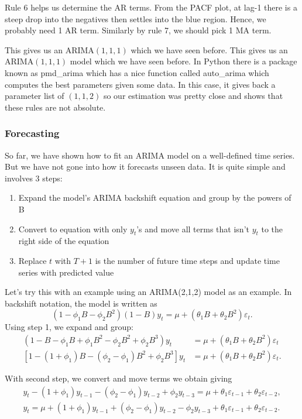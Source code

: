 \documentclass{article}
\begin{document}
  Rule 6 helps us determine the AR terms. From the PACF plot, at lag-1 there is a steep drop into the negatives then settles into the blue region. Hence, we probably need 1 AR term. Similarly by rule 7, we should pick 1 MA term.

  This gives us an ARIMA$(1,1,1)$ which we have seen before. This gives us an ARIMA$(1,1,1)$ model which we have seen before. In Python there is a package known as pmd\_arima which has a nice function called auto\_arima which computes the best parameters given some data. In this case, it gives back a parameter list of $(1,1,2)$ so our estimation was pretty close and shows that these rules are not absolute.
  

  \subsubsection{Forecasting}
  So far, we have shown how to fit an ARIMA model on a well-defined time series. But we have not gone into how it forecasts unseen data. It is quite simple and involves 3 steps:
  \begin{enumerate}
    \item Expand the model's ARIMA backshift equation and group by the powers of B
    \item Convert to equation with only $y_t$'s and move all terms that isn't $y_t$ to the right side of the equation
    \item Replace $t$ with $T+1$ is the number of future time steps and update time series with predicted value
  \end{enumerate}
  Let's try this with an example using an ARIMA(2,1,2) model as an example. In backshift notation, the model is written as
  \begin{equation*}
    (1 - \phi_1B - \phi_2B^2)(1-B)y_t = \mu + (\theta_1B + \theta_2B^2)\varepsilon_t.
  \end{equation*}
  Using step 1, we expand and group:
  \begin{align*}
    (1 - B - \phi_1B + \phi_1B^2 - \phi_2B^2 + \phi_2B^3)y_t &= \mu + (\theta_1B + \theta_2B^2)\varepsilon_t\\
    [1 - (1 + \phi_1)B - (\phi_2 - \phi_1)B^2 + \phi_2B^3]y_t &= \mu + (\theta_1B + \theta_2B^2)\varepsilon_t.
  \end{align*}

  With second step, we convert and move terms we obtain giving
  \begin{gather*}
    y_t - (1 + \phi_1)y_{t-1} - (\phi_2 - \phi_1)y_{t-2} + \phi_2y_{t-3} = \mu + \theta_1\varepsilon_{t-1} + \theta_2\varepsilon_{t-2},\\
    y_t = \mu + (1 + \phi_1)y_{t-1} + (\phi_2 - \phi_1)y_{t-2} - \phi_2y_{t-3} + \theta_1\varepsilon_{t-1} + \theta_2\varepsilon_{t-2}.
  \end{gather*}
\end{document}
